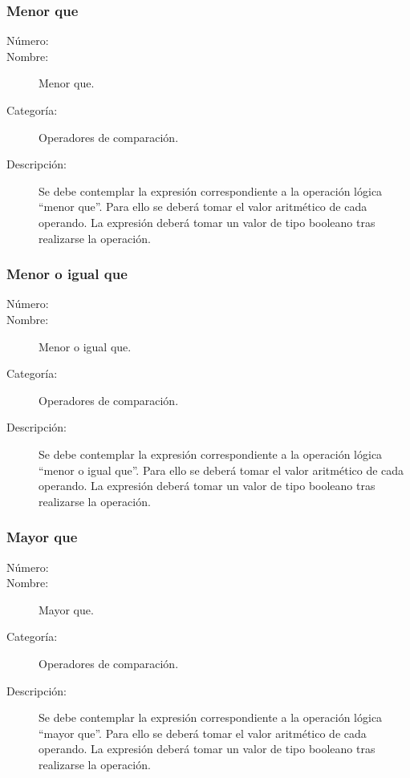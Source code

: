\subsubsection{Menor que}
\begin{framed}
	\begin{description}
		\item [Número:] \cn
		\item [Nombre:] Menor que.
		\item [Categoría:] Operadores de comparación.
		\item [Descripción:] Se debe contemplar la expresión correspondiente a la operación lógica ``menor que''. Para ello se deberá tomar
		el valor aritmético de cada operando. La expresión deberá tomar un valor de tipo booleano tras realizarse la operación.
	\end {description}
\end{framed}

\subsubsection{Menor o igual que}
\begin{framed}
	\begin{description}
		\item [Número:] \cn
		\item [Nombre:] Menor o igual que.
		\item [Categoría:] Operadores de comparación.
		\item [Descripción:] Se debe contemplar la expresión correspondiente a la operación lógica ``menor o igual que''. Para ello se deberá tomar
		el valor aritmético de cada operando. La expresión deberá tomar un valor de tipo booleano tras realizarse la operación.
	\end {description}
\end{framed}

\subsubsection{Mayor que}
\begin{framed}
	\begin{description}
		\item [Número:] \cn
		\item [Nombre:] Mayor que.
		\item [Categoría:] Operadores de comparación.
		\item [Descripción:] Se debe contemplar la expresión correspondiente a la operación lógica ``mayor que''. Para ello se deberá tomar
		el valor aritmético de cada operando. La expresión deberá tomar un valor de tipo booleano tras realizarse la operación.
	\end {description}
\end{framed}

